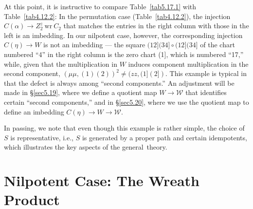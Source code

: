 \documentclass{surv-l}
\numberwithin{equation}{section}
\numberwithin{table}{section}
\numberwithin{figure}{section}
\theoremstyle{definition}
\begin{document}
At this point, it is instructive to compare Table~\ref{tab5.17.1}
with Table~\ref{tab4.12.2}: In the permutation case
(Table~\ref{tab4.12.2}), the injection $C(\alpha)\rightarrow
Z_{2}^{z}\ \mathrm{wr}\ C_{2}$ that matches the entries in the
right column with those in the left is an imbedding. In our
nilpotent case, however, the corresponding injection
$C(\eta)\rightarrow W$ is not an imbedding --- the square
$(12](34]\circ (12](34]$ of the chart numbered ``4'' in the right
column is the zero chart (1], which is numbered ``17,'' while,
given that the multiplication in $W$ induces component
multiplication in the second component, $(\mu\mu, (1)(2)
)^{2}\neq (zz, (1](2])$. This example is typical in that the
defect is always among ``second components.'' An adjustment will
be made in \S\ref{sec5.19}, where we define a quotient map
$W\rightarrow \mathcal{W}$ that identifies certain ``second
components,'' and in \S\ref{sec5.20}, where we use the quotient
map to define an imbedding $C(\eta)\rightarrow W\rightarrow
\mathcal{W}$.

In passing, we note that even though this example is rather
simple, the choice of $S$ is representative, i.e., $S$ is
generated by a proper path and certain idempotents, which
illustrates the key aspects of the general~theory.

\section{Nilpotent Case: The Wreath Product}\label{sec5.18}
\end{document}
